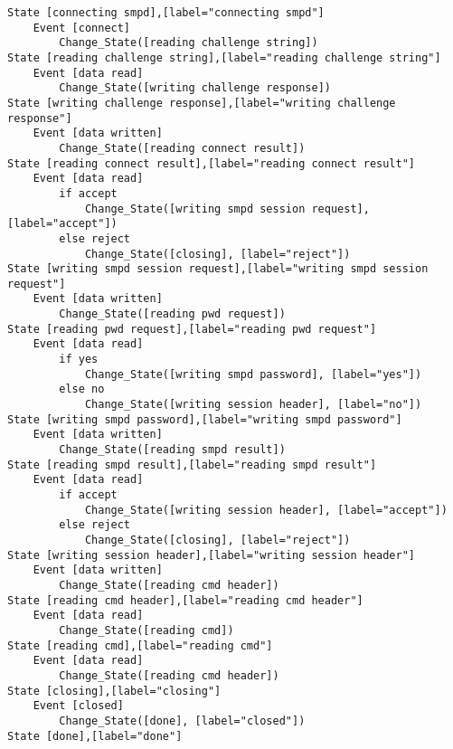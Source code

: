 \begin{comment}
This is the state machine for the smpd console session.
Graph [smpd console session],
      [size="7.5, 10"]
\end{comment}
\begin{verbatim}
State [connecting smpd],[label="connecting smpd"]
	Event [connect]
		Change_State([reading challenge string])
State [reading challenge string],[label="reading challenge string"]
	Event [data read]
		Change_State([writing challenge response])
State [writing challenge response],[label="writing challenge response"]
	Event [data written]
		Change_State([reading connect result])
State [reading connect result],[label="reading connect result"]
	Event [data read]
		if accept
			Change_State([writing smpd session request], [label="accept"])
		else reject
			Change_State([closing], [label="reject"])
State [writing smpd session request],[label="writing smpd session request"]
	Event [data written]
		Change_State([reading pwd request])
State [reading pwd request],[label="reading pwd request"]
	Event [data read]
		if yes
			Change_State([writing smpd password], [label="yes"])
		else no
			Change_State([writing session header], [label="no"])
State [writing smpd password],[label="writing smpd password"]
	Event [data written]
		Change_State([reading smpd result])
State [reading smpd result],[label="reading smpd result"]
	Event [data read]
		if accept
			Change_State([writing session header], [label="accept"])
		else reject
			Change_State([closing], [label="reject"])
State [writing session header],[label="writing session header"]
	Event [data written]
		Change_State([reading cmd header])
State [reading cmd header],[label="reading cmd header"]
	Event [data read]
		Change_State([reading cmd])
State [reading cmd],[label="reading cmd"]
	Event [data read]
		Change_State([reading cmd header])
State [closing],[label="closing"]
	Event [closed]
		Change_State([done], [label="closed"])
State [done],[label="done"]
\end{verbatim}
